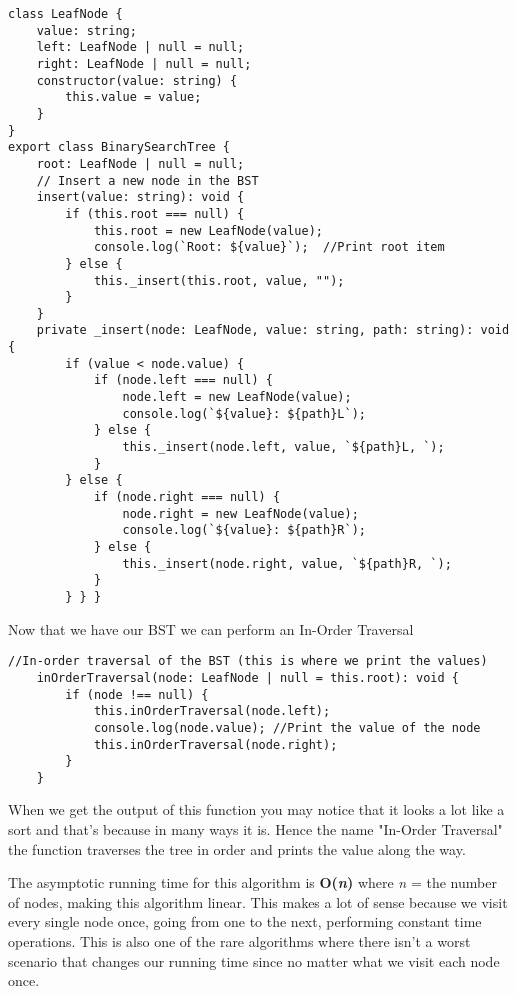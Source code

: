\documentclass[12pt,letterpaper, onecolumn]{exam}
\begin{document}
\vspace{.3cm} 

\begin{lstlisting}
class LeafNode { 
    value: string;
    left: LeafNode | null = null;
    right: LeafNode | null = null;
    constructor(value: string) {
        this.value = value;
    }
}
export class BinarySearchTree {
    root: LeafNode | null = null;
    // Insert a new node in the BST
    insert(value: string): void {
        if (this.root === null) {
            this.root = new LeafNode(value);
            console.log(`Root: ${value}`);  //Print root item 
        } else {
            this._insert(this.root, value, "");
        }
    }
    private _insert(node: LeafNode, value: string, path: string): void {
        if (value < node.value) {
            if (node.left === null) {
                node.left = new LeafNode(value);
                console.log(`${value}: ${path}L`); 
            } else {
                this._insert(node.left, value, `${path}L, `);
            }
        } else {
            if (node.right === null) {
                node.right = new LeafNode(value);
                console.log(`${value}: ${path}R`); 
            } else {
                this._insert(node.right, value, `${path}R, `);
            }    
        } } }
\end{lstlisting}

\newpage

\centering Now that we have our BST we can perform an In-Order Traversal 
\begin{lstlisting}
//In-order traversal of the BST (this is where we print the values)
    inOrderTraversal(node: LeafNode | null = this.root): void {
        if (node !== null) {
            this.inOrderTraversal(node.left);
            console.log(node.value); //Print the value of the node
            this.inOrderTraversal(node.right);
        }
    }
\end{lstlisting}

\vspace{.3cm}
\centering When we get the output of this function you may notice that it looks a lot like a sort and that's because in many ways it is. Hence the name "In-Order Traversal" the function traverses the tree in order and prints the value along the way. 

\vspace{.2cm}
\centering The asymptotic running time for this algorithm is \textbf{O(\textit{n})} where \textit{n} = the number of nodes, making this algorithm linear. This makes a lot of sense because we visit every single node once, going from one to the next, performing constant time operations. This is also one of the rare algorithms where there isn't a worst scenario that changes our running time since no matter what we visit each node once.  
\end{document}
